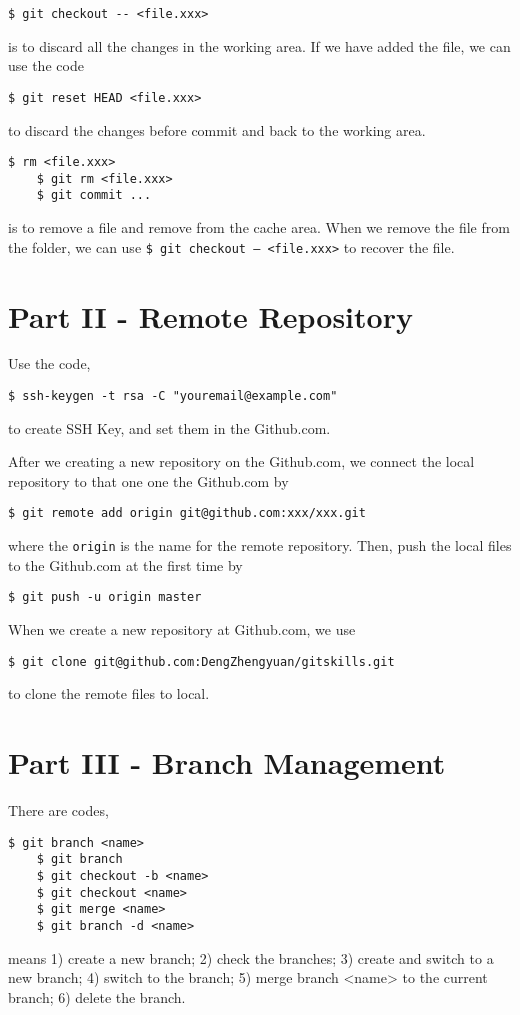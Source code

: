 \begin{lstlisting}[basicstyle=\small\conso]
    $ git checkout -- <file.xxx>
\end{lstlisting}
is to discard all the changes in the working area. 
If we have added the file, we can use the code
\begin{lstlisting}[basicstyle=\small\conso]
    $ git reset HEAD <file.xxx>
\end{lstlisting}
to discard the changes before commit and back to the working area.

\begin{lstlisting}[basicstyle=\small\conso]
    $ rm <file.xxx>
    $ git rm <file.xxx>
    $ git commit ...
\end{lstlisting}
is to remove a file and remove from the cache area. 
When we remove the file from the folder, we can use \texttt{\$ git checkout -- <file.xxx>} to recover the file.

\section{Part II - Remote Repository}
Use the code,
\begin{lstlisting}[basicstyle=\small\conso]
    $ ssh-keygen -t rsa -C "youremail@example.com"
\end{lstlisting}
to create SSH Key, and set them in the Github.com.

After we creating a new repository on the Github.com, we connect the local repository to that one one the Github.com by 
\begin{lstlisting}[basicstyle=\small\conso]
    $ git remote add origin git@github.com:xxx/xxx.git
\end{lstlisting}
where the \texttt{origin} is the name for the remote repository.
Then, push the local files to the Github.com at the first time by 
\begin{lstlisting}[basicstyle=\small\conso]
    $ git push -u origin master
\end{lstlisting}

When we create a new repository at Github.com, we use
\begin{lstlisting}[basicstyle=\small\conso]
    $ git clone git@github.com:DengZhengyuan/gitskills.git
\end{lstlisting}
to clone the remote files to local.

\section{Part III - Branch Management}
There are codes,
\begin{lstlisting}[basicstyle=\small\conso]
    $ git branch <name>
    $ git branch
    $ git checkout -b <name> 
    $ git checkout <name> 
    $ git merge <name> 
    $ git branch -d <name>
\end{lstlisting}
means 1) create a new branch; 
2) check the branches; 
3) create and switch to a new branch; 
4) switch to the branch; 
5) merge branch <name> to the current branch; 
6) delete the branch. 